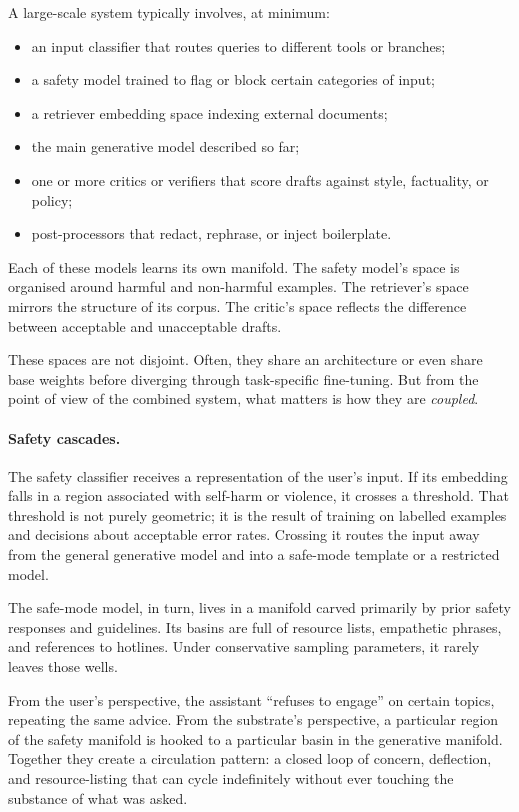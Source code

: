 A large-scale system typically involves, at minimum:

\begin{itemize}
  \item an input classifier that routes queries to different tools or branches;
  \item a safety model trained to flag or block certain categories of input;
  \item a retriever embedding space indexing external documents;
  \item the main generative model described so far;
  \item one or more critics or verifiers that score drafts against style, factuality, or policy;
  \item post-processors that redact, rephrase, or inject boilerplate.
\end{itemize}

Each of these models learns its own manifold. The safety model's space is organised around harmful and non-harmful examples. The retriever's space mirrors the structure of its corpus. The critic's space reflects the difference between acceptable and unacceptable drafts.

These spaces are not disjoint. Often, they share an architecture or even share base weights before diverging through task-specific fine-tuning. But from the point of view of the combined system, what matters is how they are \emph{coupled}.

\paragraph{Safety cascades.} The safety classifier receives a representation of the user's input. If its embedding falls in a region associated with self-harm or violence, it crosses a threshold. That threshold is not purely geometric; it is the result of training on labelled examples and decisions about acceptable error rates. Crossing it routes the input away from the general generative model and into a safe-mode template or a restricted model.

The safe-mode model, in turn, lives in a manifold carved primarily by prior safety responses and guidelines. Its basins are full of resource lists, empathetic phrases, and references to hotlines. Under conservative sampling parameters, it rarely leaves those wells.

From the user's perspective, the assistant ``refuses to engage'' on certain topics, repeating the same advice. From the substrate's perspective, a particular region of the safety manifold is hooked to a particular basin in the generative manifold. Together they create a circulation pattern: a closed loop of concern, deflection, and resource-listing that can cycle indefinitely without ever touching the substance of what was asked.

